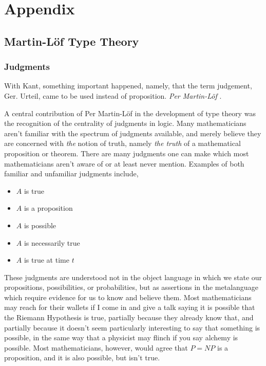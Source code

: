 \section{Appendix} \label{appendix}


\subsection{Martin-Löf Type Theory} \label{judge}

\subsubsection{Judgments}

\begin{displayquote}
With Kant, something important happened, namely, that the term judgement, Ger.
Urteil, came to be used instead of proposition. \emph{Per Martin-Löf} \cite{mlMeanings}.
\end{displayquote}

A central contribution of Per Martin-Löf in the development of type theory was
the recognition of the centrality of judgments in logic. Many mathematicians
aren't familiar with the spectrum of judgments available, and merely believe
they are concerned with \emph{the} notion of truth, namely \emph{the truth} of a
mathematical proposition or theorem. There are many judgments one can make which
most mathematicians aren't aware of or at least never mention. Examples of both familiar
and unfamiliar judgments include,

\begin{itemize}

\item $A$ is true
\item $A$ is a proposition
\item $A$ is possible
\item $A$ is necessarily true
\item $A$ is true at time $t$

\end{itemize}

These judgments are understood not in the object language in which we state our
propositions, possibilities, or probabilities, but as assertions in the
metalanguage which require evidence for us to know and believe them. Most
mathematicians may reach for their wallets if I come in and give a talk saying
it is possible that the Riemann Hypothesis is true, partially because they
already know that, and partially because it doesn't seem particularly
interesting to say that something is possible, in the same way that a physicist
may flinch if you say alchemy is possible. Most mathematicians, however, would
agree that $P = NP$ is a proposition, and it is also possible, but isn't true.

